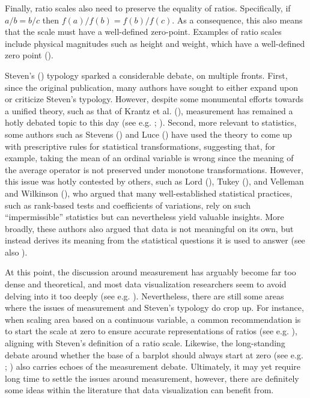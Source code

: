 \documentclass[
  openany]{book}
\theoremstyle{definition}
\theoremstyle{definition}
\theoremstyle{definition}
\theoremstyle{definition}
\theoremstyle{remark}
\begin{document}
Finally, ratio scales also need to preserve the equality of ratios. Specifically, if \(a/b = b/c\) then \(f(a)/f(b) = f(b) / f(c)\). As a consequence, this also means that the scale must have a well-defined zero-point. Examples of ratio scales include physical magnitudes such as height and weight, which have a well-defined zero point ().

Steven's () typology sparked a considerable debate, on multiple fronts. First, since the original publication, many authors have sought to either expand upon or criticize Steven's typology. However, despite some monumental efforts towards a unified theory, such as that of Krantz et al. (), measurement has remained a hotly debated topic to this day (see e.g. ; ). Second, more relevant to statistics, some authors such as Stevens () and Luce () have used the theory to come up with prescriptive rules for statistical transformations, suggesting that, for example, taking the mean of an ordinal variable is wrong since the meaning of the average operator is not preserved under monotone transformations. However, this issue was hotly contested by others, such as Lord (), Tukey (), and Velleman and Wilkinson (), who argued that many well-established statistical practices, such as rank-based tests and coefficients of variations, rely on such ``impermissible'' statistics but can nevertheless yield valuable insights. More broadly, these authors also argued that data is not meaningful on its own, but instead derives its meaning from the statistical questions it is used to answer (see also ).

At this point, the discussion around measurement has arguably become far too dense and theoretical, and most data visualization researchers seem to avoid delving into it too deeply (see e.g. ). Nevertheless, there are still some areas where the issues of measurement and Steven's typology do crop up. For instance, when scaling area based on a continuous variable, a common recommendation is to start the scale at zero to ensure accurate representations of ratios (see e.g. ), aligning with Steven's definition of a ratio scale. Likewise, the long-standing debate around whether the base of a barplot should always start at zero (see e.g. ; ) also carries echoes of the measurement debate. Ultimately, it may yet require long time to settle the issues around measurement, however, there are definitely some ideas within the literature that data visualization can benefit from.
\end{document}
